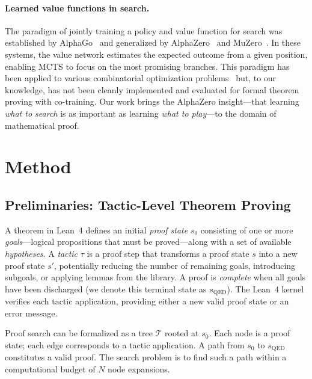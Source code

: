 \documentclass{article}
\begin{document}
\paragraph{Learned value functions in search.}
The paradigm of jointly training a policy and value function for search was established by AlphaGo~\citep{silver2016mastering} and generalized by AlphaZero~\citep{silver2017alphazero} and MuZero~\citep{schrittwieser2020mastering}. In these systems, the value network estimates the expected outcome from a given position, enabling MCTS to focus on the most promising branches. This paradigm has been applied to various combinatorial optimization problems~\citep{bengio2021machine} but, to our knowledge, has not been cleanly implemented and evaluated for formal theorem proving with co-training. Our work brings the AlphaZero insight---that learning \emph{what to search} is as important as learning \emph{what to play}---to the domain of mathematical proof.

\section{Method}
\label{sec:method}

\subsection{Preliminaries: Tactic-Level Theorem Proving}
\label{sec:preliminaries}

A theorem in Lean~4 defines an initial \emph{proof state} $s_0$ consisting of one or more \emph{goals}---logical propositions that must be proved---along with a set of available \emph{hypotheses}. A \emph{tactic} $\tau$ is a proof step that transforms a proof state $s$ into a new proof state $s'$, potentially reducing the number of remaining goals, introducing subgoals, or applying lemmas from the library. A proof is \emph{complete} when all goals have been discharged (we denote this terminal state as $s_\text{QED}$). The Lean~4 kernel verifies each tactic application, providing either a new valid proof state or an error message.

Proof search can be formalized as a tree $\mathcal{T}$ rooted at $s_0$. Each node is a proof state; each edge corresponds to a tactic application. A path from $s_0$ to $s_\text{QED}$ constitutes a valid proof. The search problem is to find such a path within a computational budget of $N$ node expansions.
\end{document}
